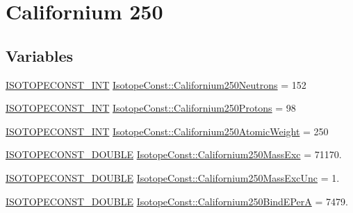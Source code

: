 \hypertarget{group___isotope_const-_californium-_cf250}{}\section{Californium 250}
\label{group___isotope_const-_californium-_cf250}
\subsection*{Variables}
\begin{DoxyCompactItemize}
\item 
\mbox{\hyperlink{group___isotope_const-_macros_ga5f18360b3e99483a35c32d789e62621c}{I\+S\+O\+T\+O\+P\+E\+C\+O\+N\+S\+T\+\_\+\+I\+NT}} \mbox{\hyperlink{group___isotope_const-_californium-_cf250_gabc92a4ce7a40c5d59bb44cf34b661f41}{Isotope\+Const\+::\+Californium250\+Neutrons}} = 152
\item 
\mbox{\hyperlink{group___isotope_const-_macros_ga5f18360b3e99483a35c32d789e62621c}{I\+S\+O\+T\+O\+P\+E\+C\+O\+N\+S\+T\+\_\+\+I\+NT}} \mbox{\hyperlink{group___isotope_const-_californium-_cf250_gaa844cd9b7ab0108783eadbce185651ac}{Isotope\+Const\+::\+Californium250\+Protons}} = 98
\item 
\mbox{\hyperlink{group___isotope_const-_macros_ga5f18360b3e99483a35c32d789e62621c}{I\+S\+O\+T\+O\+P\+E\+C\+O\+N\+S\+T\+\_\+\+I\+NT}} \mbox{\hyperlink{group___isotope_const-_californium-_cf250_ga975d6fed8a64a4427c8cd844b970c66a}{Isotope\+Const\+::\+Californium250\+Atomic\+Weight}} = 250
\item 
\mbox{\hyperlink{group___isotope_const-_macros_ga8f45a7272ce02c0b4c65c44636ed719a}{I\+S\+O\+T\+O\+P\+E\+C\+O\+N\+S\+T\+\_\+\+D\+O\+U\+B\+LE}} \mbox{\hyperlink{group___isotope_const-_californium-_cf250_ga1d3d298bf1ad417e25bcb77891bf006a}{Isotope\+Const\+::\+Californium250\+Mass\+Exc}} = 71170.
\item 
\mbox{\hyperlink{group___isotope_const-_macros_ga8f45a7272ce02c0b4c65c44636ed719a}{I\+S\+O\+T\+O\+P\+E\+C\+O\+N\+S\+T\+\_\+\+D\+O\+U\+B\+LE}} \mbox{\hyperlink{group___isotope_const-_californium-_cf250_gab1f53f79a94634099cf80f530105e89b}{Isotope\+Const\+::\+Californium250\+Mass\+Exc\+Unc}} = 1.
\item 
\mbox{\hyperlink{group___isotope_const-_macros_ga8f45a7272ce02c0b4c65c44636ed719a}{I\+S\+O\+T\+O\+P\+E\+C\+O\+N\+S\+T\+\_\+\+D\+O\+U\+B\+LE}} \mbox{\hyperlink{group___isotope_const-_californium-_cf250_ga158781b72911f8c762aecef6fd89b834}{Isotope\+Const\+::\+Californium250\+Bind\+E\+PerA}} = 7479.

\end{DoxyCompactItemize}
